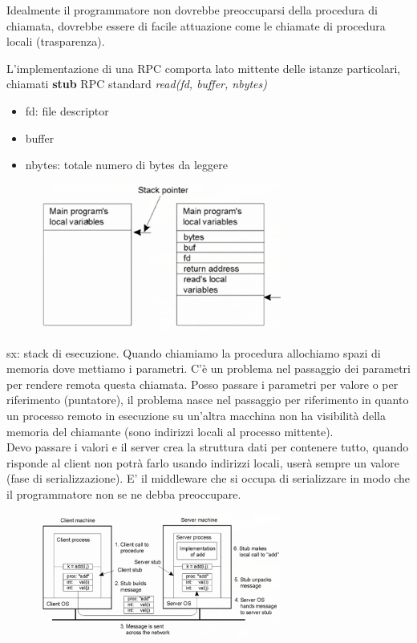 \documentclass[12pt,italian]{report}
\begin{document}
Idealmente il programmatore non dovrebbe preoccuparsi della procedura di chiamata, dovrebbe essere di facile attuazione come le chiamate di procedura locali (trasparenza). 

L'implementazione di una RPC comporta lato mittente delle istanze particolari, chiamati \textbf{stub}
\bigbreak
RPC standard \textit{read(fd, buffer, nbytes)} 
\begin{itemize}
    \item fd: file descriptor
    \item buffer
    \item nbytes: totale numero di bytes da leggere
\end{itemize}

\begin{figure}[h]
\centering
\includegraphics[width=80mm]{img/rpc.png}
\end{figure}
\noindent sx: stack di esecuzione. Quando chiamiamo la procedura allochiamo spazi di memoria dove mettiamo i parametri. C'è un problema nel passaggio dei parametri per rendere remota questa chiamata. Posso passare i parametri per valore o per riferimento (puntatore), il problema nasce nel passaggio per riferimento in quanto un processo remoto in esecuzione su un'altra macchina non ha visibilità della memoria del chiamante (sono indirizzi locali al processo mittente).
\\ Devo passare i valori e il server crea la struttura dati per contenere tutto, quando risponde al client non potrà farlo usando indirizzi locali, userà sempre un valore (fase di serializzazione). E' il middleware che si occupa di serializzare in modo che il programmatore non se ne debba preoccupare. 

\begin{figure}[h]
\centering
\includegraphics[width=80mm]{img/rpc2}
\end{figure}
\end{document}
